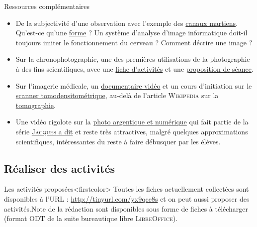 \begin{gofurther}{Ressources complémentaires}
\vspace{2pt}
\begin{itemize}\jazzitem
\item De la subjectivité d'une observation avec l'exemple des \href{https://fr.wikipedia.org/wiki/Canaux_martiens}{canaux martiens}. Qu'est-ce qu'une \href{https://fr.wikipedia.org/wiki/Psychologie_de_la_forme}{forme} ? Un système d'analyse d'image informatique doit-il toujours imiter le fonctionnement du cerveau ? Comment décrire une image ?
\item Sur la chronophotographie, une des premières utilisations de la photographie à des fins scientifiques, avec une \href{https://www.ac-paris.fr/portail/jcms/p2_691010/la-chronophotographie}{fiche d'activités} et une \href{https://upopi.ciclic.fr/transmettre/parcours-pedagogiques/le-precinema/seance-9-la-chronophotographie}{proposition de séance}.
\item Sur l'imagerie médicale, un \href{https://www.youtube.com/watch?v=fQCa6ZlTPiA}{documentaire vidéo} et un cours d'initiation sur le \href{http://ghanen.free.fr/cours/imagerie_tomographique_2007.pdf}{scanner tomodensitométrique}, au-delà de l'article \textsc{Wikipedia} sur la \href{https://fr.wikipedia.org/wiki/Tomographie}{tomographie}.
\item Une vidéo rigolote sur la \href{https://leblob.fr/techno/la-photo-de-argentique-au-numerique}{photo argentique et numérique} qui fait partie de la série \href{https://leblob.fr/series/jacques-dit}{\textsc{Jacques} a dit} et reste très attractives, malgré quelques approximations scientifiques, intéressantes du reste à faire débusquer par les élèves.
\end{itemize}
\end{gofurther}


\subsection[Réaliser des activités]{Réaliser des activités}
\label{sub:VIII.2.2}


Les activités proposées\caution[t]<firstcolor>{%
Toutes les fiches actuellement collectées sont disponibles à l'URL : \url{http://tinyurl.com/yx9qce8s} et on peut aussi proposer des activités.}{Note de la rédaction}
sont disponibles sous forme de fiches à télécharger (format ODT de la suite bureautique libre \textsc{LibreOffice}).

